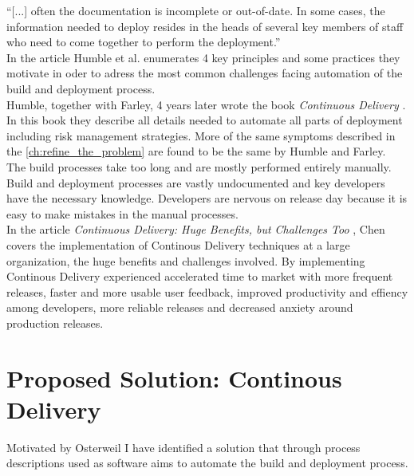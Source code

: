 \documentclass{ituthesis}
\begin{document}
``[...] often the documentation is incomplete or out-of-date. In some cases, the information needed to deploy resides in the heads of several key members of staff who need to come together to perform the deployment.'' \cite{Humble2006}\\

In the article Humble et al. enumerates 4 key principles and some practices they motivate in oder to adress the most common challenges facing automation of the build and deployment process.\\

Humble, together with Farley, 4 years later wrote the book \textit{Continuous Delivery} \cite{Humble2010}. In this book they describe all details needed to automate all parts of deployment including risk management strategies. More of the same symptoms described in the \autoref{ch:refine_the_problem} are found to be the same by Humble and Farley. The build processes take too long and are mostly performed entirely manually. Build and deployment processes are vastly undocumented and key developers have the necessary knowledge. Developers are nervous on release day because it is easy to make mistakes in the manual processes.\\

In the article \textit{Continuous Delivery: Huge Benefits, but Challenges Too} \cite{Chen2015}, Chen covers the implementation of Continous Delivery techniques at a large organization, the huge benefits and challenges involved. By implementing Continous Delivery \cite{Chen2015} experienced accelerated time to market with more frequent releases, faster and more usable user feedback, improved productivity and effiency among developers, more reliable releases and decreased anxiety around production releases.\\


\chapter{Proposed Solution: Continous Delivery}

Motivated by Osterweil \cite{Osterweil1997} I have identified a solution that through process descriptions used as software aims to automate the build and deployment process.\\
\end{document}

